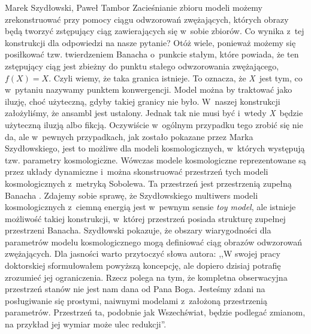 \begin{artplenv2auth}{Marek Szydłowski, Paweł Tambor}
Zacieśnianie zbioru modeli możemy zrekonstruować przy pomocy ciągu odwzorowań zwężających, których obrazy będą tworzyć zstępujący ciąg zawierających się w~sobie zbiorów. Co wynika z~tej konstrukcji dla odpowiedzi na nasze pytanie? Otóż wiele, ponieważ możemy się posiłkować tzw. twierdzeniem Banacha o~punkcie stałym, które powiada, że ten zstępujący ciąg jest zbieżny do punktu stałego odwzorowania zwężającego, $f(X)=X$. Czyli wiemy, że taka granica istnieje. To oznacza, że \textit{X}~jest tym, co w~pytaniu nazywamy punktem konwergencji. Model można by traktować jako iluzję, choć użyteczną, gdyby takiej granicy nie było. W~naszej konstrukcji założyliśmy, że ansambl jest ustalony. Jednak tak nie musi być i~wtedy \textit{X}~będzie użyteczną iluzją albo fikcją. Oczywiście w~ogólnym przypadku tego zrobić się nie da, ale w~pewnych przypadkach, jak zostało pokazane przez Marka Szydłowskiego, jest to możliwe dla modeli kosmologicznych, w~których występują tzw. parametry kosmologiczne. Wówczas modele kosmologiczne reprezentowane są przez układy dynamiczne i~można skonstruować przestrzeń tych modeli kosmologicznych z~metryką Sobolewa. Ta przestrzeń jest przestrzenią zupełną Banacha
\parencite[][]{szydlowski_cosmological_2007}. %
 Zdajemy sobie sprawę, że Szydłowskiego multiwers modeli kosmologicznych z~ciemną energią jest w~pewnym sensie \textit{toy model}, ale istnieje możliwość takiej konstrukcji, w~której przestrzeń posiada strukturę zupełnej przestrzeni Banacha. Szydłowski pokazuje, że obszary wiarygodności dla parametrów modelu kosmologicznego mogą definiować ciąg obrazów odwzorowań zwężających. Dla jasności warto przytoczyć słowa autora: ,,W swojej pracy doktorskiej sformułowałem powyższą koncepcję, ale dopiero dzisiaj potrafię zrozumieć jej ograniczenia. Rzecz polega na tym, że kompletna obserwacyjna przestrzeń stanów nie jest nam dana od Pana Boga. Jesteśmy zdani na posługiwanie się prostymi, naiwnymi modelami z~założoną przestrzenią parametrów. Przestrzeń ta, podobnie jak Wszechświat, będzie podlegać zmianom, na przykład jej wymiar może ulec redukcji''.


\end{artplenv2auth}
